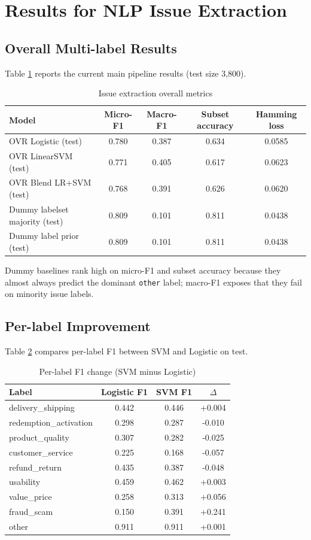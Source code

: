 \documentclass[12pt,a4paper]{article}
\begin{document}
\section{Results for NLP Issue Extraction}
\subsection{Overall Multi-label Results}
Table \ref{tab:issue_overall} reports the current main pipeline results (test size 3,800).

\begin{table}[H]
\centering
\caption{Issue extraction overall metrics}
\label{tab:issue_overall}
\begin{tabular}{lcccc}
\toprule
Model & Micro-F1 & Macro-F1 & Subset accuracy & Hamming loss \\
\midrule
OVR Logistic (test) & 0.780 & 0.387 & 0.634 & 0.0585 \\
OVR LinearSVM (test) & 0.771 & 0.405 & 0.617 & 0.0623 \\
OVR Blend LR+SVM (test) & 0.768 & 0.391 & 0.626 & 0.0620 \\
Dummy labelset majority (test) & 0.809 & 0.101 & 0.811 & 0.0438 \\
Dummy label prior (test) & 0.809 & 0.101 & 0.811 & 0.0438 \\
\bottomrule
\end{tabular}
\end{table}

Dummy baselines rank high on micro-F1 and subset accuracy because they almost always predict the dominant \texttt{other} label; macro-F1 exposes that they fail on minority issue labels.

\subsection{Per-label Improvement}
Table \ref{tab:issue_delta} compares per-label F1 between SVM and Logistic on test.

\begin{table}[H]
\centering
\caption{Per-label F1 change (SVM minus Logistic)}
\label{tab:issue_delta}
\begin{tabular}{lccc}
\toprule
Label & Logistic F1 & SVM F1 & $\Delta$ \\
\midrule
delivery\_shipping & 0.442 & 0.446 & +0.004 \\
redemption\_activation & 0.298 & 0.287 & -0.010 \\
product\_quality & 0.307 & 0.282 & -0.025 \\
customer\_service & 0.225 & 0.168 & -0.057 \\
refund\_return & 0.435 & 0.387 & -0.048 \\
usability & 0.459 & 0.462 & +0.003 \\
value\_price & 0.258 & 0.313 & +0.056 \\
fraud\_scam & 0.150 & 0.391 & +0.241 \\
other & 0.911 & 0.911 & +0.001 \\
\bottomrule
\end{tabular}
\end{table}
\end{document}
